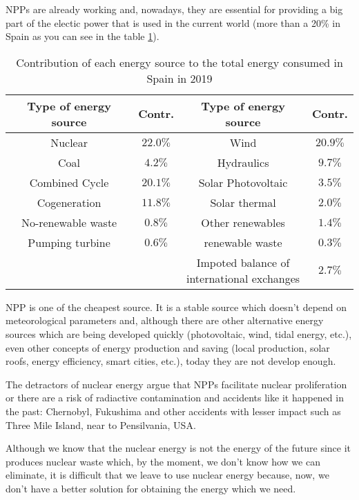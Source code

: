NPPs are already working and, nowadays, they are essential for providing a big part of the electic power that is used in the current world (more than a 20\% in Spain as you can see in the table \ref{tab:PercentageEnergySpain}). 

\begin{table}[htbp]
\begin{center}
\begin{tabular}{|c|c|c|c|}
\hline
Type of energy source & Contr. & Type of energy source & Contr.  \\
\hline \hline
Nuclear & $22.0\%$ & Wind & $20.9\%$  \\ \hline
Coal & $4.2\%$ & Hydraulics & $9.7\%$  \\ \hline
Combined Cycle & $20.1\%$ & Solar Photovoltaic & $3.5\%$  \\ \hline
Cogeneration & $11.8\%$ & Solar thermal & $2.0\%$  \\ \hline
No-renewable waste & $0.8\%$ & Other renewables & $1.4\%$  \\ \hline
Pumping turbine & $0.6\%$ & renewable waste & $0.3\%$  \\ \hline
 &  & \parbox{11em}{\centering Impoted balance of\\  international exchanges} & $2.7\%$\\ \hline
\end{tabular}
\caption{Contribution of each energy source to the total energy consumed in Spain in 2019 \cite{PercentageEnergySpain}}
\label{tab:PercentageEnergySpain}
\end{center}
\end{table}

NPP is one of the cheapest source. It is a stable source which doesn't depend on  meteorological parameters and, although there are other alternative energy sources which are being developed quickly  (photovoltaic, wind, tidal energy, etc.), even other concepts of energy production and saving (local production, solar roofs, energy efficiency, smart cities, etc.), today they are not develop enough.  

The detractors of nuclear energy argue that NPPs facilitate nuclear proliferation or there are a risk of radiactive contamination and accidents like it happened in the past: Chernobyl, Fukushima and other accidents with lesser impact such as Three Mile Island, near to Pensilvania, USA.

Although we know that the nuclear energy is not the energy of the future since it produces nuclear waste which, by the moment, we don't know how we can eliminate, it is difficult that we leave to use nuclear energy because, now, we don't have a better solution for obtaining the energy which we need. 

